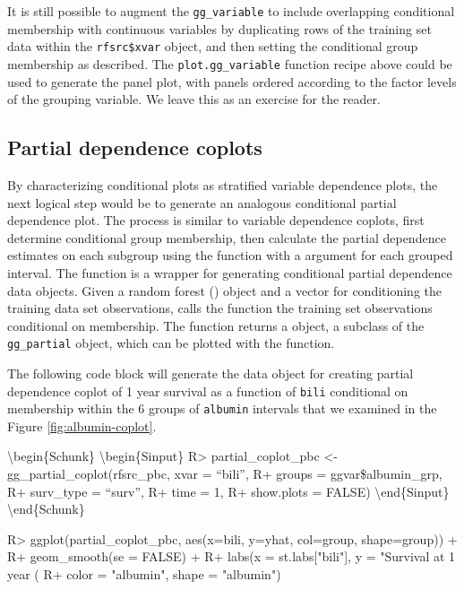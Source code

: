 \documentclass[article, nojss]{jss}
\begin{document}
It is still possible to augment the \texttt{gg\_variable} to include
overlapping conditional membership with continuous variables by
duplicating rows of the training set data within the
\texttt{rfsrc\$xvar} object, and then setting the conditional group
membership as described. The \texttt{plot.gg\_variable} function recipe
above could be used to generate the panel plot, with panels ordered
according to the factor levels of the grouping variable. We leave this
as an exercise for the reader.

\subsection{Partial dependence
coplots}\label{partial-dependence-coplots}

By characterizing conditional plots as stratified variable dependence
plots, the next logical step would be to generate an analogous
conditional partial dependence plot. The process is similar to variable
dependence coplots, first determine conditional group membership, then
calculate the partial dependence estimates on each subgroup using the
 function with a  argument for each
grouped interval. The  
function is a wrapper for generating conditional partial dependence data
objects. Given a random forest () object and a 
vector for conditioning the training data set observations,
 calls the  function the
training set observations conditional on  membership. The
function returns a  object, a subclass of the
\texttt{gg\_partial} object, which can be plotted with the
 function.

The following code block will generate the data object for creating
partial dependence coplot of 1 year survival as a function of
\texttt{bili} conditional on membership within the 6 groups of
\texttt{albumin} intervals that we examined in the Figure
\ref{fig:albumin-coplot}.

\textbackslash{}begin\{Schunk\} \textbackslash{}begin\{Sinput\}
R\textgreater{} partial\_coplot\_pbc \textless{}-
gg\_partial\_coplot(rfsrc\_pbc, xvar = ``bili'', R+ groups =
ggvar\$albumin\_grp, R+ surv\_type = ``surv'', R+ time = 1, R+
show.plots = FALSE) \textbackslash{}end\{Sinput\}
\textbackslash{}end\{Schunk\}

\begin{Schunk}
\begin{Sinput}
R> ggplot(partial_coplot_pbc, aes(x=bili, y=yhat, col=group, shape=group)) +
R+   geom_smooth(se = FALSE) +
R+   labs(x = st.labs["bili"], y = "Survival at 1 year (%
R+        color = "albumin", shape = "albumin")
\end{Sinput}
\end{Schunk}
\end{document}
